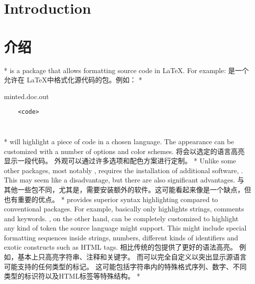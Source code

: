 \begin{paracol}{2}
\section{Introduction}
\switchcolumn
\section{介绍}
\switchcolumn[0]*%
 is a package that allows formatting source code in \LaTeX.
For example:
\switchcolumn
{} 是一个允许在 \LaTeX 中格式化源代码的包。例如：
\switchcolumn[0]*%
\begin{VerbatimOut}[gobble=1]{minted.doc.out}
  \begin{verbatim}
    <code>
  \end{verbatim}
\end{VerbatimOut}
\inputminted[gobble=2,frame=lines]{latex}{minted.doc.out}
\switchcolumn
\inputminted[gobble=2,frame=lines]{latex}{minted.doc.out}
\switchcolumn[0]*%
will highlight a piece of code in a chosen language.
The appearance can be customized with a number of options and color schemes.
\switchcolumn   
将会以选定的语言高亮显示一段代码。
外观可以通过许多选项和配色方案进行定制。
\switchcolumn[0]*%
Unlike some other packages, most notably ,  requires
the installation of additional software, .
This may seem like a disadvantage, but there are also significant advantages.
\switchcolumn 
与其他一些包不同，尤其是，需要安装额外的软件。这可能看起来像是一个缺点，但也有重要的优点。
\switchcolumn[0]*%
 provides superior syntax highlighting compared to conventional packages.
For example,  basically only highlights strings, comments and keywords.
, on the other hand, can be completely customized to highlight any kind of token the
source language might support.
This might include special formatting sequences inside strings, numbers, different kinds of
identifiers and exotic constructs such as HTML tags.
\switchcolumn 
{}相比传统的包提供了更好的语法高亮。
例如，基本上只高亮字符串、注释和关键字。
而可以完全自定义以突出显示源语言可能支持的任何类型的标记。
这可能包括字符串内的特殊格式序列、数字、不同类型的标识符以及HTML标签等特殊结构。
\switchcolumn[0]*%

\end{paracol}
